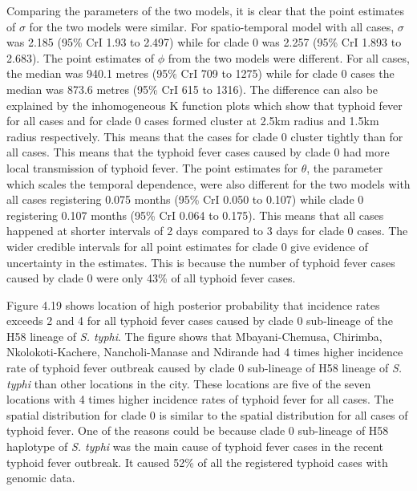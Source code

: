 \documentclass[12pt,a4paper]{report}
\begin{document}
Comparing the parameters of the two models, it is clear that the point estimates of $\sigma$ for the two models were similar. For spatio-temporal model with all cases, $\sigma$ was 2.185 (95\% CrI 1.93 to 2.497) while for clade 0 was 2.257 (95\% CrI 1.893 to 2.683). The point estimates of $\phi$ from the two models were different. For all cases, the median was 940.1 metres (95\% CrI 709 to 1275) while for clade 0 cases the median was 873.6 metres (95\% CrI 615 to 1316). The difference can also be explained by the inhomogeneous K function plots which show that typhoid fever for all cases and for clade 0 cases formed cluster at 2.5km radius and 1.5km radius respectively. This means that the cases for clade 0 cluster tightly than for all cases. This means that the typhoid fever cases caused by clade 0 had more local transmission of typhoid fever. The point estimates for $\theta$, the parameter which scales the temporal dependence, were also different for the two models with all cases registering 0.075 months  (95\% CrI 0.050 to 0.107) while clade 0 registering 0.107 months (95\% CrI 0.064 to 0.175). This means that all cases happened at shorter intervals of 2 days compared to 3 days for clade 0 cases. The wider credible intervals for all point estimates for clade 0 give evidence of uncertainty in the estimates. This is because the number of typhoid fever cases caused by clade 0 were only 43\% of all typhoid fever cases.

Figure 4.19 shows location of high posterior probability  that incidence rates exceeds 2 and 4 for all typhoid fever cases caused by clade 0 sub-lineage of the H58 lineage of \textit{S. typhi}. The figure shows that Mbayani-Chemusa, Chirimba, Nkolokoti-Kachere, Nancholi-Manase and Ndirande had 4 times higher incidence rate of typhoid fever outbreak caused by clade 0 sub-lineage of H58 lineage of \textit{S. typhi} than other locations in the city. These locations are five of the seven locations with 4 times higher incidence rates of typhoid fever for all cases. The spatial distribution for clade 0 is similar to the spatial distribution for all cases of typhoid fever. One of the reasons could be because  clade 0 sub-lineage of H58 haplotype of \textit{S. typhi} was the main cause of typhoid fever cases in the recent typhoid fever outbreak. It caused 52\% of all the registered typhoid cases with genomic data.
\end{document}
